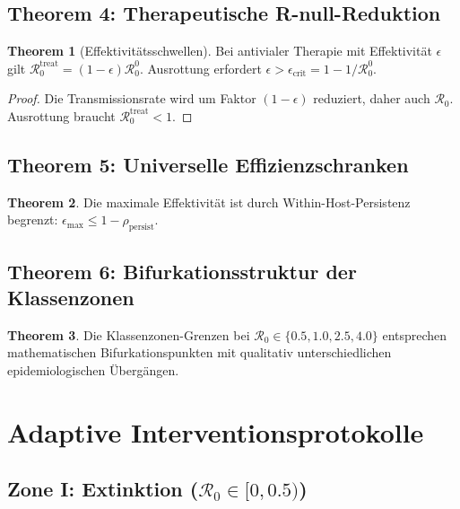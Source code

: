 ﻿\documentclass[a4paper,12pt,twoside]{article}
\theoremstyle{definition}
\newtheorem{theorem}{Theorem}[section]
\begin{document}
\subsection{Theorem 4: Therapeutische R-null-Reduktion}

\begin{theorem}[Effektivitätsschwellen]
Bei antivialer Therapie mit Effektivität $\epsilon$ gilt $\mathcal{R}_0^{\text{treat}} = (1-\epsilon) \mathcal{R}_0^0$. Ausrottung erfordert $\epsilon > \epsilon_{\text{crit}} = 1 - 1/\mathcal{R}_0^0$.
\end{theorem}

\begin{proof}
Die Transmissionsrate wird um Faktor $(1-\epsilon)$ reduziert, daher auch $\mathcal{R}_0$. Ausrottung braucht $\mathcal{R}_0^{\text{treat}} < 1$.
\end{proof}

\subsection{Theorem 5: Universelle Effizienzschranken}

\begin{theorem}
Die maximale Effektivität ist durch Within-Host-Persistenz begrenzt: $\epsilon_{\max} \leq 1 - \rho_{\text{persist}}$.
\end{theorem}

\subsection{Theorem 6: Bifurkationsstruktur der Klassenzonen}

\begin{theorem}
Die Klassenzonen-Grenzen bei $\mathcal{R}_0 \in \{0.5, 1.0, 2.5, 4.0\}$ entsprechen mathematischen Bifurkationspunkten mit qualitativ unterschiedlichen epidemiologischen Übergängen.
\end{theorem}

\section{Adaptive Interventionsprotokolle}
\label{sec:interventions}

\subsection{Zone I: Extinktion ($\mathcal{R}_0 \in [0, 0.5)$)}
\end{document}
